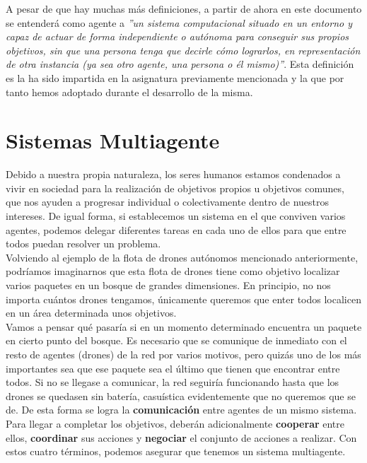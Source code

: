 A pesar de que hay muchas más definiciones, a partir de ahora en este documento se entenderá como agente a \textit{''un sistema computacional situado en un entorno y capaz de actuar de forma independiente o autónoma para conseguir sus propios objetivos, sin que una persona tenga que decirle cómo lograrlos, en representación de otra instancia (ya sea otro agente, una persona o él mismo)''}. Esta definición es la ha sido impartida en la asignatura previamente mencionada y la que por tanto hemos adoptado durante el desarrollo de la misma.

\section{Sistemas Multiagente}

Debido a nuestra propia naturaleza, los seres humanos estamos condenados a vivir en sociedad para la realización de objetivos propios u objetivos comunes, que nos ayuden a progresar individual o colectivamente dentro de nuestros intereses. De igual forma, si establecemos un sistema en el que conviven varios agentes, podemos delegar diferentes tareas en cada uno de ellos para que entre todos puedan resolver un problema.\\

Volviendo al ejemplo de la flota de drones autónomos mencionado anteriormente, podríamos imaginarnos que esta flota de drones tiene como objetivo localizar varios paquetes en un bosque de grandes dimensiones. En principio, no nos importa cuántos drones tengamos, únicamente queremos que enter todos localicen en un área determinada unos objetivos.\\

Vamos a pensar qué pasaría si en un momento determinado encuentra un paquete en cierto punto del bosque. Es necesario que se comunique de inmediato con el resto de agentes (drones) de la red por varios motivos, pero quizás uno de los más importantes sea que ese paquete sea el último que tienen que encontrar entre todos. Si no se llegase a comunicar, la red seguiría funcionando hasta que los drones se quedasen sin batería, casuística evidentemente que no queremos que se de. De esta forma se logra la \textbf{comunicación} entre agentes de un mismo sistema.\\

Para llegar a completar los objetivos, deberán adicionalmente \textbf{cooperar} entre ellos, \textbf{coordinar} sus acciones y \textbf{negociar} el conjunto de acciones a realizar. Con estos cuatro términos, podemos asegurar que tenemos un sistema multiagente.

